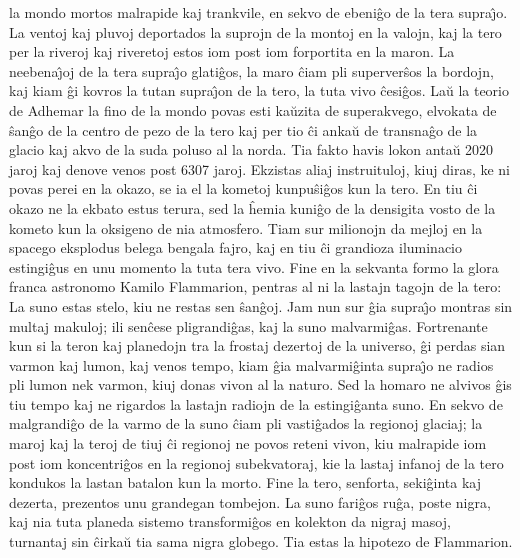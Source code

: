 la mondo mortos malrapide kaj trankvile, en sekvo de ebeni\^go de la
tera supra\^{\j}o. La ventoj kaj pluvoj deportados la suprojn de la
montoj en la valojn, kaj la tero per la riveroj kaj riveretoj estos
iom post iom forportita en la maron. La neebena\^{\j}oj de la tera
supra\^{\j}o glati\^gos, la maro \^ciam pli superver\^sos la
bordojn, kaj kiam \^gi kovros la tutan supra\^{\j}on de la tero, la
tuta vivo \^cesi\^gos. La\u u la teorio de Adhemar la fino de la
mondo povas esti ka\u uzita de superakvego, elvokata de \^san\^go de
la centro de pezo de la tero kaj per tio \^ci anka\u u de
transna\^go de la glacio kaj akvo de la suda poluso al la norda. Tia
fakto havis lokon anta\u u 2020 jaroj kaj denove venos post 6307
jaroj. Ekzistas aliaj instruituloj, kiuj diras, ke ni povas perei en
la okazo, se ia el la kometoj kunpu\^si\^gos kun la tero. En tiu
\^ci okazo ne la ekbato estus terura, sed la \^hemia kuni\^go de la
densigita vosto de la kometo kun la oksigeno de nia atmosfero. Tiam
sur milionojn da mejloj en la spacego eksplodus belega bengala
fajro, kaj en tiu \^ci grandioza iluminacio estingi\^gus en unu
momento la tuta tera vivo. Fine en la sekvanta formo la glora franca
astronomo Kamilo Flammarion, pentras al ni la lastajn tagojn de la
tero: La suno estas stelo, kiu ne restas sen \^san\^goj. Jam nun sur
\^gia supra\^{\j}o montras sin multaj makuloj; ili sen\^cese
pligrandi\^gas, kaj la suno malvarmi\^gas. Fortrenante kun si la
teron kaj planedojn tra la frostaj dezertoj de la universo, \^gi
perdas sian varmon kaj lumon, kaj venos tempo, kiam \^gia
malvarmi\^ginta supra\^{\j}o ne radios pli lumon nek varmon, kiuj
donas vivon al la naturo. Sed la homaro ne alvivos \^gis tiu tempo
kaj ne rigardos la lastajn radiojn de la estingi\^ganta suno. En
sekvo de malgrandi\^go de la varmo de la suno \^ciam pli
vasti\^gados la regionoj glaciaj; la maroj kaj la teroj de tiuj \^ci
regionoj ne povos reteni vivon, kiu malrapide iom post iom
koncentri\^gos en la regionoj subekvatoraj, kie la lastaj infanoj de
la tero kondukos la lastan batalon kun la morto. Fine la tero,
senforta, seki\^ginta kaj dezerta, prezentos unu grandegan tombejon.
La suno fari\^gos ru\^ga, poste nigra, kaj nia tuta planeda sistemo
transformi\^gos en kolekton da nigraj masoj, turnantaj sin \^cirka\u
u tia sama nigra globego. Tia estas la hipotezo de Flammarion.

